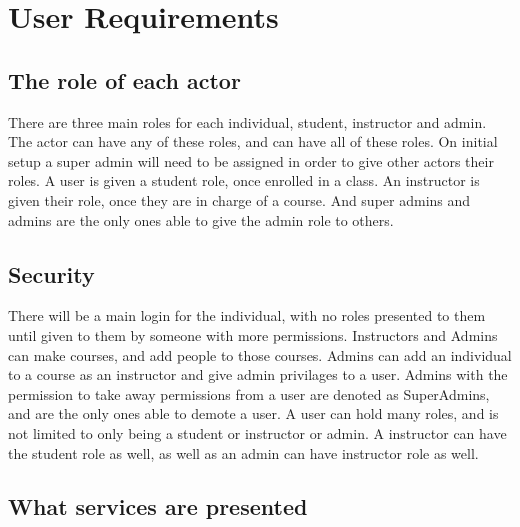 \documentclass[12pt]{article}
\begin{document}
    \maketitle

    \newpage

    \tableofcontents

    \newpage


    \section{User Requirements}\label{sec:user-requirements}

    \subsection{The role of each actor}\label{subsec:the-role-of-each-actor}

    There are three main roles for each individual, student, instructor and admin.
    The actor can have any of these roles, and can have all of these roles.
    On initial setup a super admin will need to be assigned in order to give other actors their roles.
    A user is given a student role, once enrolled in a class.
    An instructor is given their role, once they are in charge of a course.
    And super admins and admins are the only ones able to give the admin role to others.

    \subsection{Security}\label{subsec:security}

    There will be a main login for the individual, with no roles presented to them until given to them by someone with more permissions.
    Instructors and Admins can make courses, and add people to those courses.
    Admins can add an individual to a course as an instructor and give admin privilages to a user.
    Admins with the permission to take away permissions from a user are denoted as SuperAdmins, and are the only ones able to demote a user.
    A user can hold many roles, and is not limited to only being a student or instructor or admin.
    A instructor can have the student role as well, as well as an admin can have instructor role as well.

    \subsection{What services are presented}\label{subsec:what-services-are-presented}
\end{document}
